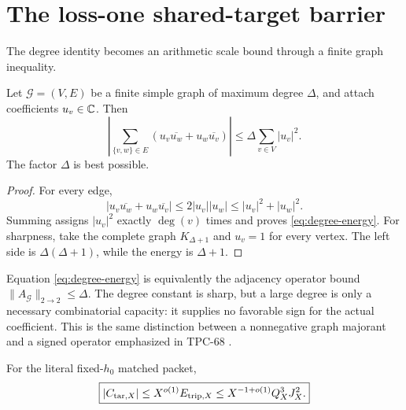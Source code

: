 \section{The loss-one shared-target barrier}
\label{sec:loss-one-barrier}

The degree identity becomes an arithmetic scale bound through a
finite graph inequality.

\begin{lemma}
\label{lem:degree-energy}
Let \(\mathscr G=(V,E)\) be a finite simple graph of maximum degree
\(\Delta\), and attach coefficients \(u_v\in\mathbb C\).  Then
\begin{equation}
 \boxed{
 \left|
 \sum_{\{v,w\}\in E}
 \left(u_v\overline{u_w}+u_w\overline{u_v}\right)
 \right|
 \le
 \Delta\sum_{v\in V}|u_v|^2.}
\label{eq:degree-energy}
\end{equation}
The factor \(\Delta\) is best possible.
\end{lemma}

\begin{proof}
For every edge,
\[
 |u_v\overline{u_w}+u_w\overline{u_v}|
 \le2|u_v||u_w|
 \le|u_v|^2+|u_w|^2.
\]
Summing assigns \(|u_v|^2\) exactly \(\deg(v)\) times and proves
\eqref{eq:degree-energy}.  For sharpness, take the complete graph
\(K_{\Delta+1}\) and \(u_v=1\) for every vertex.  The left side is
\(\Delta(\Delta+1)\), while the energy is \(\Delta+1\).
\end{proof}

\begin{remark}
Equation \eqref{eq:degree-energy} is equivalently the adjacency
operator bound
\(\|A_{\mathscr G}\|_{2\to2}\le\Delta\).  The degree constant is
sharp, but a large degree is only a necessary combinatorial capacity:
it supplies no favorable sign for the actual coefficient.  This is
the same distinction between a nonnegative graph majorant and a signed
operator emphasized in TPC-68 \citep{WangTPC68}.
\end{remark}

\begin{theorem}
\label{thm:target-loss-one}
For the literal fixed-\(h_0\) matched packet,
\begin{equation}
 \boxed{
 |C_{\mathrm{tar},X}|
 \le
 X^{o(1)}E_{{\rm trip},X}
 \le
 X^{-1+o(1)}Q_X^3J_X^2.}
\label{eq:target-loss-one}
\end{equation}
\end{theorem}

